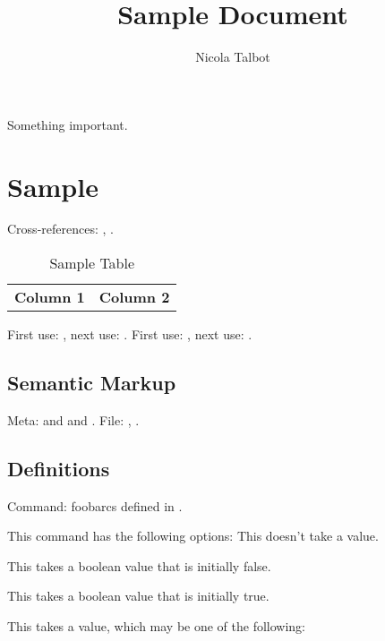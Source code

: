 \documentclass[titlepage=false,oneside,
 fontsize=12pt,captions=tableheading]{scrbook}
\title{Sample Document}
\author{Nicola Talbot}
\begin{document}
\maketitle

\begin{important}
Something important.
\end{important}

\frontmatter
\tableofcontents

\mainmatter
\chapter{Sample}\label{ch:sample}

Cross-references: , .

\begin{table}[htbp]
\caption{Sample Table}
\label{tab:sample}
\centering
\begin{tabular}{ll}
\bfseries Column 1 &
\bfseries Column 2 \\
\end{tabular}
\end{table}

First use: , next use: .
First use: , next use: .

\section{Semantic Markup}\label{sec:semantic}

Meta:  and  and .
File: , 
. 

\section{Definitions}\label{sec:defs}

Command: \gls{foobarcs} defined in .


This command has the following options:
This doesn't take a value.

This takes a boolean value that is initially false.

This takes a boolean value that is initially true.

This takes a value, which may be one of the following:
\end{document}
